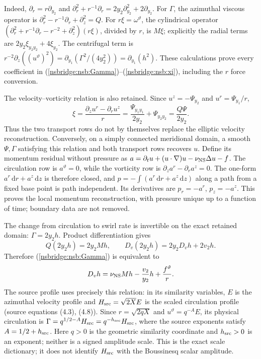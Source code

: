 \documentclass[11pt]{article}
\begin{document}
Indeed, $\partial_r=r\partial_{y_2}$ and
$\partial_r^2+r^{-1}\partial_r=2y_2\partial_{y_2}^2+2\partial_{y_2}$.
For $\Gamma$, the azimuthal viscous operator is
$\partial_r^2-r^{-1}\partial_r+\partial_z^2=Q$.
For $r\xi=\omega^\vartheta$, the cylindrical operator
$(\partial_r^2+r^{-1}\partial_r-r^{-2}+\partial_z^2)(r\xi)$,
divided by $r$, is $M\xi$; explicitly the radial terms are
$2y_2\xi_{y_2y_2}+4\xi_{y_2}$. The centrifugal term is
$r^{-2}\partial_z((u^\vartheta)^2)=\partial_{y_1}(\Gamma^2/(4y_2^2))
=\partial_{y_1}(h^2)$. These calculations prove every coefficient in
(\ref{nsbridge:nsb:Gamma})--(\ref{nsbridge:nsb:xi}), including the $r$ force conversion.

The velocity--vorticity relation is also retained. Since
$u^z=-\Psi_{y_2}$ and $u^r=\Psi_{y_1}/r$,
\[
 \xi=\frac{\partial_z u^r-\partial_r u^z}{r}
     =\frac{\Psi_{y_1y_1}}{2y_2}+\Psi_{y_2y_2}
     =\frac{Q\Psi}{2y_2}.
\]
Thus the two transport rows do not by themselves replace the elliptic
velocity reconstruction. Conversely, on a simply connected meridional
domain, a smooth $\Psi,\Gamma$ satisfying this relation and both transport
rows recovers $u$. Define its momentum residual without pressure as
$a=\partial_tu+(u\cdot\nabla)u-\nu_{\rm NS}\Delta u-f$.
The circulation row is $a^\vartheta=0$, while the vorticity row is
$\partial_z a^r-\partial_r a^z=0$. The one-form
$a^r\,\mathrm dr+a^z\,\mathrm dz$ is therefore closed, and
$p=-\int(a^r\,\mathrm dr+a^z\,\mathrm dz)$ along a path from a fixed
base point is path independent. Its derivatives are $p_r=-a^r$,
$p_z=-a^z$. This proves the local momentum reconstruction, with pressure
unique up to a function of time; boundary data are not removed.

The change from circulation to swirl rate is invertible on the exact retained
domain: $\Gamma=2y_2h$. Product differentiation gives
\[
 Q(2y_2h)=2y_2Mh,\qquad
 D_v(2y_2h)=2y_2D_vh+2v_2h.
\]
Therefore (\ref{nsbridge:nsb:Gamma}) is equivalent to
\begin{equation}
 D_vh=\nu_{\rm NS}Mh-\frac{v_2}{y_2}h+\frac{f^\vartheta}{r}.
 \label{nsbridge:nsb:h}
\end{equation}
The source profile uses precisely this relation: in its similarity variables,
$E$ is the azimuthal velocity profile and
$H_{\rm src}=\sqrt{2X}E$ is the scaled circulation profile (source equations
(4.3), (4.8)). Since $r=\sqrt{2qX}$ and
$u^\vartheta=q^{-A}E$, its physical circulation is
$\Gamma=q^{1/2-A}H_{\rm src}=q^{-h_{\rm src}}H_{\rm src}$,
where the source exponents satisfy $A=1/2+h_{\rm src}$. Here $q>0$ is the
geometric similarity coordinate and $h_{\rm src}>0$ is an exponent; neither
is a signed amplitude scale. This is the exact scale dictionary; it does not
identify $H_{\rm src}$ with the Boussinesq scalar amplitude.
\end{document}
